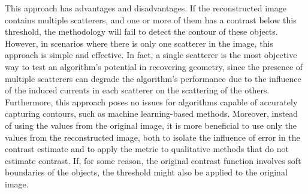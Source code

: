 \documentclass{IEEEtran}
\begin{document}
            This approach has advantages and disadvantages. If the reconstructed image contains multiple scatterers, and one or more of them has a contrast below this threshold, the methodology will fail to detect the contour of these objects. However, in scenarios where there is only one scatterer in the image, this approach is simple and effective. In fact, a single scatterer is the most objective way to test an algorithm's potential in recovering geometry, since the presence of multiple scatterers can degrade the algorithm's performance due to the influence of the induced currents in each scatterer on the scattering of the others. Furthermore, this approach poses no issues for algorithms capable of accurately capturing contours, such as machine learning-based methods. Moreover, instead of using the values from the original image, it is more beneficial to use only the values from the reconstructed image, both to isolate the influence of error in the contrast estimate and to apply the metric to qualitative methods that do not estimate contrast. If, for some reason, the original contrast function involves soft boundaries of the objects, the threshold might also be applied to the original image.
			
			
\end{document}
